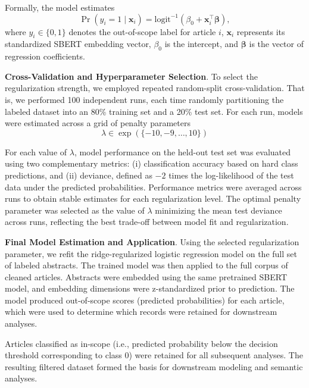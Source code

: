 \documentclass[pdflatex,sn-mathphys-num]{sn-jnl}%
\theoremstyle{thmstyleone}%
\theoremstyle{thmstyletwo}%
\theoremstyle{thmstylethree}%
\begin{document}
Formally, the model estimates
\[
\Pr(y_i = 1 \mid \mathbf{x}_i) = \mathrm{logit}^{-1}\left(\beta_0 + \mathbf{x}_i^\top \boldsymbol{\beta}\right),
\]
where $y_i \in \{0,1\}$ denotes the out-of-scope label for article $i$, $\mathbf{x}_i$ represents its standardized SBERT embedding vector, $\beta_0$ is the intercept, and $\boldsymbol{\beta}$ is the vector of regression coefficients.

\vspace{0.70em}

\textbf{Cross-Validation and Hyperparameter Selection}.
To select the regularization strength, we employed repeated random-split cross-validation. That is, we performed 100 independent runs, each time randomly partitioning the labeled dataset into an 80\% training set and a 20\% test set. For each run, models were estimated across a grid of penalty parameters
\[
\lambda \in \exp\left(\{-10, -9, \ldots, 10\}\right)
\]

For each value of $\lambda$, model performance on the held-out test set was evaluated using two complementary metrics: (i) classification accuracy based on hard class predictions, and (ii) deviance, defined as $-2$ times the log-likelihood of the test data under the predicted probabilities. Performance metrics were averaged across runs to obtain stable estimates for each regularization level. The optimal penalty parameter was selected as the value of $\lambda$ minimizing the mean test deviance across runs, reflecting the best trade-off between model fit and regularization.

\vspace{0.70em}

\textbf{Final Model Estimation and Application}.
Using the selected regularization parameter, we refit the ridge-regularized logistic regression model on the full set of labeled abstracts. The trained model was then applied to the full corpus of cleaned articles. Abstracts were embedded using the same pretrained SBERT model, and embedding dimensions were z-standardized prior to prediction. The model produced out-of-scope scores (predicted probabilities) for each article, which were used to determine which records were retained for downstream analyses.

Articles classified as in-scope (i.e., predicted probability below the decision threshold corresponding to class 0) were retained for all subsequent analyses. The resulting filtered dataset formed the basis for downstream modeling and semantic analyses.

\vspace{0.70em}
\end{document}
